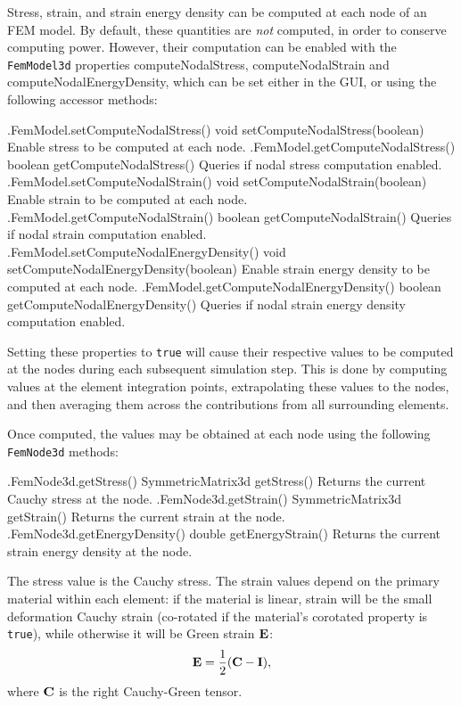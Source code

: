 Stress, strain, and strain energy density can be computed at each node
of an FEM model. By default, these quantities are {\it not} computed,
in order to conserve computing power. However, their computation can
be enabled with the {\tt FemModel3d} properties {\sf
computeNodalStress}, {\sf computeNodalStrain} and {\sf
computeNodalEnergyDensity}, which can be set either in the GUI, or
using the following accessor methods:
%
\begin{methodtable}{0.45}{0.55}
\midline
%
\methodentry
{\fem.FemModel.setComputeNodalStress()}%
{void setComputeNodalStress(boolean)}%
{Enable stress to be computed at each node.}%
%
\methodentry
{\fem.FemModel.getComputeNodalStress()}%
{boolean getComputeNodalStress()}%
{Queries if nodal stress computation enabled.}%
%
\methodspace{0.5em}
%
\methodentry
{\fem.FemModel.setComputeNodalStrain()}%
{void setComputeNodalStrain(boolean)}%
{Enable strain to be computed at each node.}%
%
\methodentry
{\fem.FemModel.getComputeNodalStrain()}%
{boolean getComputeNodalStrain()}%
{Queries if nodal strain computation enabled.}%
%
\methodspace{0.5em}
%
\methodentry
{\fem.FemModel.setComputeNodalEnergyDensity()}%
{void setComputeNodalEnergyDensity(boolean)}%
{Enable strain energy density to be computed at each node.}%
%
\methodentry
{\fem.FemModel.getComputeNodalEnergyDensity()}%
{boolean getComputeNodalEnergyDensity()}%
{Queries if nodal strain energy density computation enabled.}%
%
\midline
\end{methodtable}
%
Setting these properties to {\tt true} will cause their respective
values to be computed at the nodes during each subsequent simulation
step. This is done by computing values at the element integration
points, extrapolating these values to the nodes, and then averaging
them across the contributions from all surrounding elements.

Once computed, the values may be obtained at each node using the
following {\tt FemNode3d} methods:
%
\begin{methodtable}{0.45}{0.55}
\midline
%
\methodentry
{\fem.FemNode3d.getStress()}%
{SymmetricMatrix3d getStress()}%
{Returns the current Cauchy stress at the node.}%
%
\methodentry
{\fem.FemNode3d.getStrain()}%
{SymmetricMatrix3d getStrain()}%
{Returns the current strain at the node.}%
%
\methodentry
{\fem.FemNode3d.getEnergyDensity()}%
{double getEnergyStrain()}%
{Returns the current strain energy density at the node.}%
%
\midline
\end{methodtable}
%
The stress value is the Cauchy stress. The strain values depend on the
primary material within each element: if the material is linear,
strain will be the small deformation Cauchy strain (co-rotated if the
material's {\sf corotated} property is {\tt true}), while otherwise it
will be Green strain ${\bf E}$:
%
\begin{equation}
{\bf E} = \frac{1}{2}({\bf C} - {\bf I}),
\end{equation}
%
where ${\bf C}$ is the right Cauchy-Green tensor.


